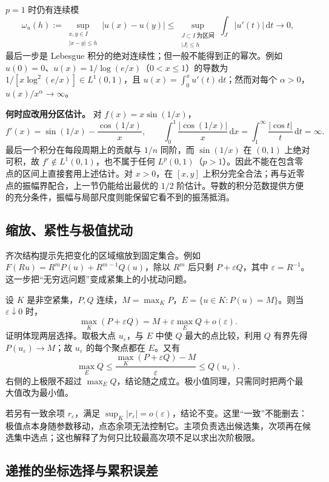 \documentclass[12pt,fontset=fandol]{ctexart}
\begin{document}
$p=1$ 时仍有连续模
\[
\omega_u(h):=\sup_{\substack{x,y\in I\\|x-y|\le h}}|u(x)-u(y)|
\le\sup_{\substack{J\subset I\ \text{为区间}\\|J|\le h}}
\int_J|u'(t)|\,\mathrm dt\longrightarrow0,
\]
最后一步是 Lebesgue 积分的绝对连续性；但一般不能得到正的幂次。例如 $u(0)=0$、$u(x)=1/\log(e/x)$（$0<x\le1$）的导数为 $1/[x\log^2(e/x)]\in L^1(0,1)$，且 $u(x)=\int_0^xu'(t)\,\mathrm dt$；然而对每个 $\alpha>0$，$u(x)/x^\alpha\to\infty$。

\textbf{何时应改用分区估计。} 对 $f(x)=x\sin(1/x)$，
\[
f'(x)=\sin(1/x)-\frac{\cos(1/x)}x,
\qquad
\int_0^1\frac{|\cos(1/x)|}{x}\,\mathrm dx
=\int_1^\infty\frac{|\cos t|}{t}\,\mathrm dt=\infty.
\]
最后一个积分在每段周期上的贡献与 $1/n$ 同阶，而 $\sin(1/x)$ 在 $(0,1)$ 上绝对可积，故 $f'\notin L^1(0,1)$，也不属于任何 $L^p(0,1)$（$p>1$）。因此不能在包含零点的区间上直接套用上述估计。对 $x>0$，在 $[x,y]$ 上积分完全合法；再与近零点的振幅界配合，上一节仍能给出最优的 $1/2$ 阶估计。导数的积分范数提供方便的充分条件，振幅与局部尺度则能保留它看不到的振荡抵消。

\subsection{缩放、紧性与极值扰动}

\label{app:estimate-scaling}

齐次结构提示先把变化的区域缩放到固定集合。例如 $F(Ru)=R^mP(u)+R^{m-1}Q(u)$，除以 $R^m$ 后只剩 $P+\varepsilon Q$，其中 $\varepsilon=R^{-1}$。这一步把“无穷远问题”变成紧集上的小扰动问题。

设 $K$ 是非空紧集，$P,Q$ 连续，$M=\max_KP$，$E=\{u\in K:P(u)=M\}$。则当 $\varepsilon\downarrow0$ 时，
\[
\max_K(P+\varepsilon Q)=M+\varepsilon\max_EQ+o(\varepsilon).
\]
证明体现两层选择。取极大点 $u_\varepsilon$，与 $E$ 中使 $Q$ 最大的点比较，利用 $Q$ 有界先得 $P(u_\varepsilon)\to M$；故 $u_\varepsilon$ 的每个聚点都在 $E$。又有
\[
\max_EQ\leq\frac{\max_K(P+\varepsilon Q)-M}{\varepsilon}
\leq Q(u_\varepsilon).
\]
右侧的上极限不超过 $\max_EQ$，结论随之成立。极小值同理，只需同时把两个最大值改为最小值。

若另有一致余项 $r_\varepsilon$，满足 $\sup_K|r_\varepsilon|=o(\varepsilon)$，结论不变。这里“一致”不能删去：极值点本身随参数移动，点态余项无法控制它。主项负责选出候选集，次项再在候选集中选点；这也解释了为何只比较最高次项不足以求出次阶极限。

\subsection{递推的坐标选择与累积误差}
\end{document}
